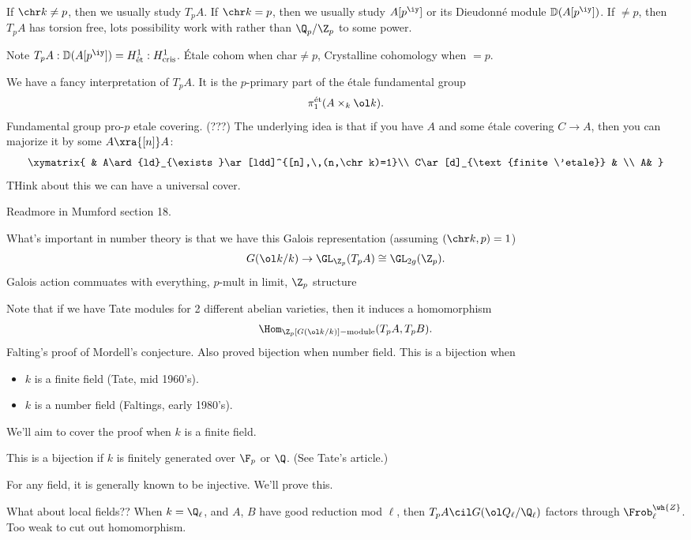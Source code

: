 \begin{rem}
If $\chr k\ne p$, then we usually study $T_pA$. If $\chr k=p$, then we usually study $A[p^{\iy}]$ or its Dieudonn\'e module $\mathbb D(A[p^{\iy}])$. If $\ne p$, then $T_pA$ %
 has torsion free, lots possibility work with rather than $\Q_p/\Z_p$ to some power.

Note $T_pA:\mathbb D(A[p^{\iy}])=H^1_{\text{\'et}}:H^1_{\text{cris}}$.
\'Etale cohom when char$\ne p$, Crystalline cohomology when $=p$.
\end{rem}
We have a fancy interpretation of $T_pA$. It is the $p$-primary part of the \'etale fundamental group
\[
\pi_1^{\text{\'et}}(A\times_k\ol k).
\]
Fundamental group pro-$p$ etale covering. (???)
The underlying idea is that if you have $A$ and some \'etale covering $C\to A$, then you can majorize it by some $A\xra{[n]}A$:
\[
\xymatrix{
& A\ard{ld}_{\exists}\ar[ldd]^{[n],\,(n,\chr k)=1}\\
C\ar[d]_{\text{finite \'etale}} & \\
A& 
}
\]
THink about this we can have a universal cover.

Readmore in Mumford section 18.

What's important in number theory is that we have this Galois representation (assuming $(\chr k,p)=1$)
\[
G(\ol k/k)\to \GL_{\Z_p} (T_p A)\cong \GL_{2g}(\Z_p).
\]
Galois action commuates with everything, $p$-mult in limit, $\Z_p$ structure

Note that if we have Tate modules for 2 different abelian varieties, then it induces a homomorphism 
\[\Hom_{\Z_p[G(\ol k/k)]-\text{module}}(T_pA,T_pB).\] Falting's proof of Mordell's conjecture. Also proved bijection when number field. 
This is a bijection when 
\begin{itemize}
\item
$k$ is a finite field (Tate, mid 1960's).
\item 
$k$ is a number field (Faltings, early 1980's).
\end{itemize}
We'll aim to cover the proof when $k$ is a finite field.
\begin{conj}
This is a bijection if $k$ is finitely generated over $\F_p$ or $\Q$. (See Tate's article.) %
\end{conj}
For any field, it is generally known to be injective. We'll prove this. 

What about local fields??
When $k=\Q_{\ell}$, and $A$, $B$ have good reduction mod $\ell$, then $T_pA\cil G(\ol Q_{\ell}/\Q_{\ell})$ factors through $\Frob_{\ell}^{\wh{Z}}$. Too weak to cut out homomorphism. %

